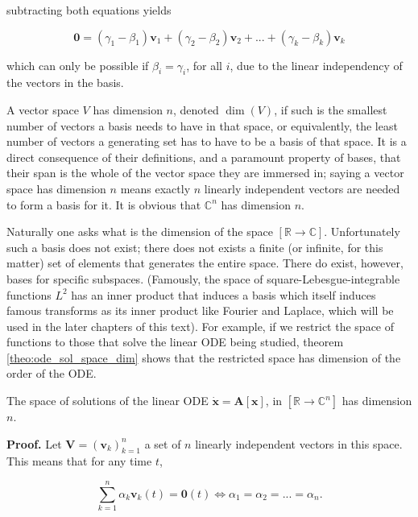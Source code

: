 	\noindent subtracting both equations yields

\begin{equation} \mathbf{0} = \left(\gamma_1 - \beta_1\right) \mathbf{v}_1 + \left(\gamma_2 - \beta_2\right)\mathbf{v}_2 + ... + \left(\gamma_k - \beta_k\right) \mathbf{v}_k \end{equation}

	\noindent which can only be possible if $\beta_i = \gamma_i$, for all $i$, due to the linear independency of the vectors in the basis.

	A vector space $V$ has dimension $n$, denoted $\dim\left(V\right)$, if such is the smallest number of vectors a basis needs to have in that space, or equivalently, the least number of vectors a generating set has to have to be a basis of that space. It is a direct consequence of their definitions, and a paramount property of bases, that their span is the whole of the vector space they are immersed in; saying a vector space has dimension $n$ means exactly $n$ linearly independent vectors are needed to form a basis for it. It is obvious that $\mathbb{C}^n$ has dimension $n$.

	Naturally one asks what is the dimension of the space $\left[\mathbb{R}\to\mathbb{C}\right]$. Unfortunately such a basis does not exist; there does not exists a finite (or infinite, for this matter) set of elements that generates the entire space. There do exist, however, bases for specific subspaces. (Famously, the space of square-Lebesgue-integrable functions $L^2$ has an inner product that induces a basis which itself induces famous transforms as its inner product like Fourier and Laplace, which will be used in the later chapters of this text). For example, if we restrict the space of functions to those that solve the linear ODE being studied, theorem \ref{theo:ode_sol_space_dim} shows that the restricted space has dimension of the order of the ODE.

\begin{theorem}\label{theo:ode_sol_space_dim} %
	The space of solutions of the linear ODE $\dot{\mathbf{x}} = \mathbf{A}\left[\mathbf{x}\right]$, in $\left[\mathbb{R}\to\mathbb{C}^n\right]$ has dimension $n$.
\end{theorem}
\noindent\textbf{Proof.} Let $\mathbf{V} = \left(\mathbf{v}_k\right)_{k=1}^n$ a set of $n$ linearly independent vectors in this space. This means that for any time $t$,

\begin{equation} \sum_{k=1}^n \alpha_k \mathbf{v}_k(t) = \mathbf{0}(t)\Leftrightarrow \alpha_1 = \alpha_2 = ... = \alpha_n .\end{equation}

